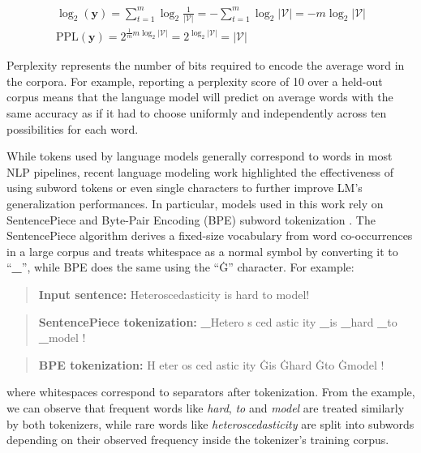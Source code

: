 \documentclass[a4paper, nobind]{templates/ociamthesis}
\begin{document}
\begin{align} 
\log_2(\textbf{y}) = \sum_{t=1}^m \log_2 \frac{1}{|\mathcal{V}|} = - \sum_{t=1}^m \log_2 |\mathcal{V}| = -m \log_2 |\mathcal{V}| \\
\text{PPL}(\textbf{y}) = 2^{\frac{1}{m}m\log_2 |\mathcal{V}|} = 2^{\log_2 |\mathcal{V}|} = |\mathcal{V}|
\end{align}

Perplexity represents the number of bits required to encode the average word in the corpora. For example, reporting a perplexity score of 10 over a held-out corpus means that the language model will predict on average words with the same accuracy as if it had to choose uniformly and independently across ten possibilities for each word.

While tokens used by language models generally correspond to words in most NLP pipelines, recent language modeling work highlighted the effectiveness of using subword tokens \autocites{sennrich-etal-2016-neural}{wu-etal-2016-google}{kudo-richardson-2018-sentencepiece} or even single characters to further improve LM's generalization performances. In particular, models used in this work rely on SentencePiece and Byte-Pair Encoding (BPE) subword tokenization \autocites{sennrich-etal-2016-neural}{kudo-richardson-2018-sentencepiece}. The SentencePiece algorithm derives a fixed-size vocabulary from word co-occurrences in a large corpus and treats whitespace as a normal symbol by converting it to ``\textbf{\_}'', while BPE does the same using the ``Ġ'' character. For example:

\begin{quote}
\textbf{Input sentence:} Heteroscedasticity is hard to model!
\end{quote}

\begin{quote}
\textbf{SentencePiece tokenization:} \textbf{\_}Hetero s ced astic ity \textbf{\_}is \textbf{\_}hard \textbf{\_}to \textbf{\_}model !
\end{quote}

\begin{quote}
\textbf{BPE tokenization:} H eter os ced astic ity Ġis Ġhard Ġto Ġmodel !
\end{quote}

where whitespaces correspond to separators after tokenization. From the example, we can observe that frequent words like \emph{hard}, \emph{to} and \emph{model} are treated similarly by both tokenizers, while rare words like \emph{heteroscedasticity} are split into subwords depending on their observed frequency inside the tokenizer's training corpus.
\end{document}
